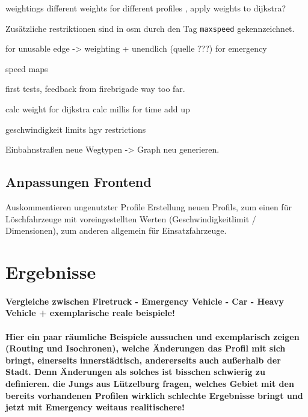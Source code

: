\documentclass[12pt,a4paper]{article}
\begin{document}
weightings 
 different weights for different profiles , apply weights to dijkstra?
 
Zusätzliche restriktionen sind in \gls{osm} durch den Tag \lstinline!maxspeed! gekennzeichnet.

 for unusable edge -> weighting + unendlich (quelle ???)
 for emergency 

 
speed maps


first tests, feedback from firebrigade
way too far.

calc weight for dijkstra
calc millis for time add up



geschwindigkeit limits
hgv restrictions


Einbahnstraßen
neue Wegtypen
-> Graph neu generieren.

\subsection{Anpassungen Frontend}

	Auskommentieren ungenutzter Profile
	Erstellung neuen Profils, zum einen für Löschfahrzeuge mit voreingestellten Werten (Geschwindigkeitlimit / Dimensionen), zum anderen allgemein für Einsatzfahrzeuge. 

\newpage
\section{Ergebnisse}
\paragraph{
Vergleiche zwischen Firetruck - Emergency Vehicle - Car - Heavy Vehicle
+ exemplarische reale beispiele!
}
\paragraph{
\color{red}
Hier ein paar räumliche Beispiele aussuchen und exemplarisch zeigen (Routing und Isochronen), welche Änderungen das Profil mit sich bringt, einerseits innerstädtisch, andererseits auch außerhalb der Stadt. Denn Änderungen als solches ist bisschen schwierig zu definieren. die Jungs aus Lützelburg fragen, welches Gebiet mit den bereits vorhandenen Profilen wirklich schlechte Ergebnisse bringt und jetzt mit Emergency weitaus realitischere!
}
\end{document}
